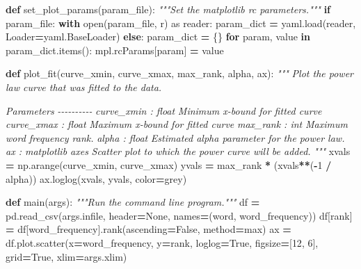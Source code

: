 \documentclass[
]{krantz}
\makeatletter
\newenvironment{Shaded}{\begin{snugshade}}{\end{snugshade}}
\newcommand{\BuiltInTok}[1]{#1}
\newcommand{\CommentTok}[1]{\textcolor[rgb]{0.56,0.35,0.01}{\textit{#1}}}
\newcommand{\ControlFlowTok}[1]{\textcolor[rgb]{0.13,0.29,0.53}{\textbf{#1}}}
\newcommand{\DecValTok}[1]{\textcolor[rgb]{0.00,0.00,0.81}{#1}}
\newcommand{\ImportTok}[1]{#1}
\newcommand{\KeywordTok}[1]{\textcolor[rgb]{0.13,0.29,0.53}{\textbf{#1}}}
\newcommand{\NormalTok}[1]{#1}
\newcommand{\OperatorTok}[1]{\textcolor[rgb]{0.81,0.36,0.00}{\textbf{#1}}}
\newcommand{\StringTok}[1]{\textcolor[rgb]{0.31,0.60,0.02}{#1}}
\newcommand{\VariableTok}[1]{\textcolor[rgb]{0.00,0.00,0.00}{#1}}
\newenvironment{kframe}{%
\medskip{}
\setlength{\fboxsep}{.8em}
 \def\at@end@of@kframe{}%
 \ifinner\ifhmode%
  \def\at@end@of@kframe{\end{minipage}}%
  \begin{minipage}{\columnwidth}%
 \fi\fi%
 \def\FrameCommand##1{\hskip\@totalleftmargin \hskip-\fboxsep
 \colorbox{shadecolor}{##1}\hskip-\fboxsep
     \hskip-\linewidth \hskip-\@totalleftmargin \hskip\columnwidth}%
 \MakeFramed {\advance\hsize-\width
   \@totalleftmargin\z@ \linewidth\hsize
   \@setminipage}}%
 {\par\unskip\endMakeFramed%
 \at@end@of@kframe}
\renewenvironment{Shaded}{\begin{kframe}}{\end{kframe}}
\makeatother
\begin{document}
\begin{Shaded}
\begin{Highlighting}[]
\KeywordTok{def}\NormalTok{ set\_plot\_params(param\_file):}
    \CommentTok{"""Set the matplotlib rc parameters."""}
    \ControlFlowTok{if}\NormalTok{ param\_file:}
        \ControlFlowTok{with} \BuiltInTok{open}\NormalTok{(param\_file, }\StringTok{\textquotesingle{}r\textquotesingle{}}\NormalTok{) }\ImportTok{as}\NormalTok{ reader:}
\NormalTok{            param\_dict }\OperatorTok{=}\NormalTok{ yaml.load(reader, Loader}\OperatorTok{=}\NormalTok{yaml.BaseLoader)}
    \ControlFlowTok{else}\NormalTok{:}
\NormalTok{        param\_dict }\OperatorTok{=}\NormalTok{ \{\}}
    \ControlFlowTok{for}\NormalTok{ param, value }\KeywordTok{in}\NormalTok{ param\_dict.items():}
\NormalTok{        mpl.rcParams[param] }\OperatorTok{=}\NormalTok{ value}


\KeywordTok{def}\NormalTok{ plot\_fit(curve\_xmin, curve\_xmax, max\_rank, alpha, ax):}
    \CommentTok{"""}
\CommentTok{    Plot the power law curve that was fitted to the data.}

\CommentTok{    Parameters}
\CommentTok{    {-}{-}{-}{-}{-}{-}{-}{-}{-}{-}}
\CommentTok{    curve\_xmin : float}
\CommentTok{        Minimum x{-}bound for fitted curve}
\CommentTok{    curve\_xmax : float}
\CommentTok{        Maximum x{-}bound for fitted curve}
\CommentTok{    max\_rank : int}
\CommentTok{        Maximum word frequency rank.}
\CommentTok{    alpha : float}
\CommentTok{        Estimated alpha parameter for the power law.}
\CommentTok{    ax : matplotlib axes}
\CommentTok{        Scatter plot to which the power curve will be added.}
\CommentTok{    """}
\NormalTok{    xvals }\OperatorTok{=}\NormalTok{ np.arange(curve\_xmin, curve\_xmax)}
\NormalTok{    yvals }\OperatorTok{=}\NormalTok{ max\_rank }\OperatorTok{*}\NormalTok{ (xvals}\OperatorTok{**}\NormalTok{(}\OperatorTok{{-}}\DecValTok{1} \OperatorTok{/}\NormalTok{ alpha))}
\NormalTok{    ax.loglog(xvals, yvals, color}\OperatorTok{=}\StringTok{\textquotesingle{}grey\textquotesingle{}}\NormalTok{)}


\KeywordTok{def}\NormalTok{ main(args):}
    \CommentTok{"""Run the command line program."""}
\NormalTok{    df }\OperatorTok{=}\NormalTok{ pd.read\_csv(args.infile, header}\OperatorTok{=}\VariableTok{None}\NormalTok{, names}\OperatorTok{=}\NormalTok{(}\StringTok{\textquotesingle{}word\textquotesingle{}}\NormalTok{, }\StringTok{\textquotesingle{}word\_frequency\textquotesingle{}}\NormalTok{))}
\NormalTok{    df[}\StringTok{\textquotesingle{}rank\textquotesingle{}}\NormalTok{] }\OperatorTok{=}\NormalTok{ df[}\StringTok{\textquotesingle{}word\_frequency\textquotesingle{}}\NormalTok{].rank(ascending}\OperatorTok{=}\VariableTok{False}\NormalTok{, method}\OperatorTok{=}\StringTok{\textquotesingle{}max\textquotesingle{}}\NormalTok{)}
\NormalTok{    ax }\OperatorTok{=}\NormalTok{ df.plot.scatter(x}\OperatorTok{=}\StringTok{\textquotesingle{}word\_frequency\textquotesingle{}}\NormalTok{, y}\OperatorTok{=}\StringTok{\textquotesingle{}rank\textquotesingle{}}\NormalTok{, loglog}\OperatorTok{=}\VariableTok{True}\NormalTok{,}
\NormalTok{                         figsize}\OperatorTok{=}\NormalTok{[}\DecValTok{12}\NormalTok{, }\DecValTok{6}\NormalTok{], grid}\OperatorTok{=}\VariableTok{True}\NormalTok{, xlim}\OperatorTok{=}\NormalTok{args.xlim)}


\end{Highlighting}
\end{Shaded}
\end{document}
